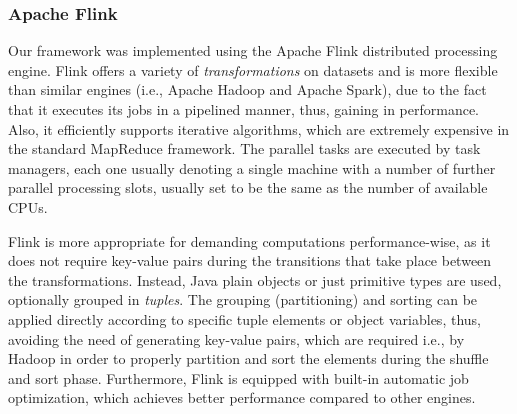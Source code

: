 \subsubsection{Apache Flink}
\label{subsec:flink}
Our framework was implemented using the Apache Flink distributed processing engine. Flink offers a variety of \textit{transformations} on datasets and is more flexible than similar engines (i.e., Apache Hadoop and Apache Spark), due to the fact that it executes its jobs in a pipelined manner, thus, gaining in performance. Also, it efficiently supports iterative algorithms, which are extremely expensive in the standard MapReduce framework. The parallel tasks are executed by task managers, each one usually denoting a single machine with a number of further parallel processing slots, usually set to be the same as the number of available CPUs. 

Flink is more appropriate for demanding computations performance-wise, as it does not require key-value pairs during the transitions that take place between the transformations. Instead, Java plain objects or just primitive types are used, optionally grouped in \textit{tuples}. The grouping (partitioning) and sorting can be applied directly according to specific tuple elements or object variables, thus, avoiding the need of generating key-value pairs, which are required i.e., by Hadoop in order to properly partition and sort the elements during the shuffle and sort phase. Furthermore, Flink is equipped with built-in automatic job optimization, which achieves better performance compared to other engines.

